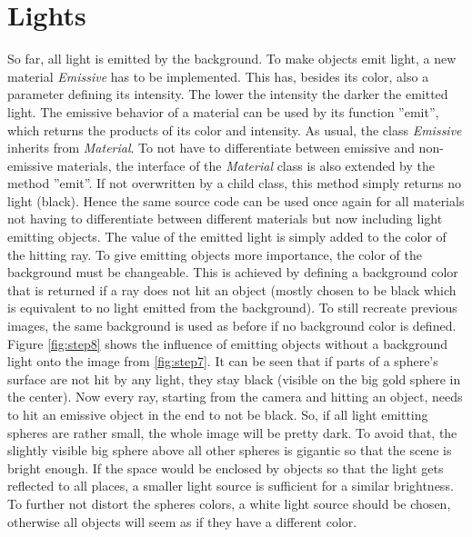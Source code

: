 \documentclass[12pt]{report}
\begin{document}
\chapter{Lights}
So far, all light is emitted by the background. To make objects emit light, a new material \textit{Emissive} has to be implemented. This has, besides its color, also a parameter defining its intensity. The lower the intensity the darker the emitted light. The emissive behavior of a material can be used by its function ''emit'', which returns the products of its color and intensity. As usual, the class \textit{Emissive} inherits from \textit{Material}. To not have to differentiate between emissive and non-emissive materials, the interface of the \textit{Material} class is also extended by the method ''emit''. If not overwritten by a child class, this method simply returns no light (black). Hence the same source code can be used once again for all materials not having to differentiate between different materials but now including light emitting objects. The value of the emitted light is simply added to the color of the hitting ray. To give emitting objects more importance, the color of the background must be changeable. This is achieved by defining a background color that is returned if a ray does not hit an object (mostly chosen to be black which is equivalent to no light emitted from the background). To still recreate previous images, the same background is used as before if no background color is defined. Figure \ref{fig:step8} shows the influence of emitting objects without a background light onto the image from \ref{fig:step7}. It can be seen that if parts of a sphere's surface are not hit by any light, they stay black (visible on the big gold sphere in the center). Now every ray, starting from the camera and hitting an object, needs to hit an emissive object in the end to not be black. So, if all light emitting spheres are rather small, the whole image will be pretty dark. To avoid that, the slightly visible big sphere above all other spheres is gigantic so that the scene is bright enough. If the space would be enclosed by objects so that the light gets reflected to all places, a smaller light source is sufficient for a similar brightness. To further not distort the spheres colors, a white light source should be chosen, otherwise all objects will seem as if they have a different color.
\end{document}
